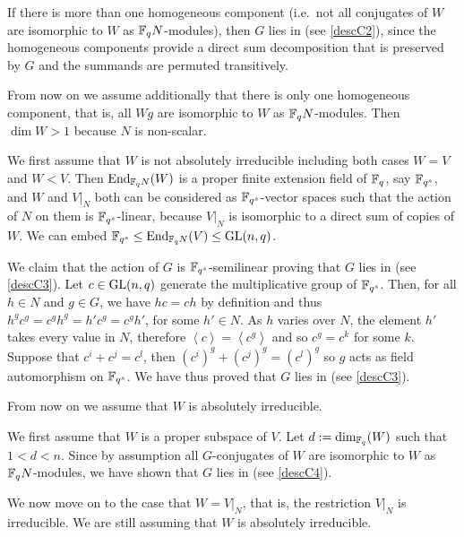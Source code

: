If there is more than one homogeneous component (i.e.~not all conjugates of
$W$ are isomorphic to $W$ as $\mathbb{F}_q N$-modules), then $G$ lies in 
(see \ref{descC2}),
since the homogeneous components provide a direct sum decomposition that is
preserved by $G$ and the summands are permuted transitively.

From now on we assume additionally that there is only one homogeneous
component, that is, all $Wg$ are isomorphic to $W$ as $\mathbb{F}_q N$-modules.
Then $\dim W > 1$ because $N$ is non-scalar.

We first assume that $W$ is not absolutely irreducible including both
cases $W = V$ and $W < V$. Then $\End_{\F_q N}(W)$ is a proper finite
extension field of $\mathbb{F}_q$, say $\mathbb{F}_{q^s}$, and $W$ and $V|_N$
both can be considered as $\mathbb{F}_{q^s}$-vector spaces such that the action of
$N$ on them is $\mathbb{F}_{q^s}$-linear, because $V|_N$ is isomorphic to a direct
sum of copies of $W$. We can embed $\F_{q^s} \le \End_{\F_q N}(V) \le \GL(n,q)$.

We claim that the action of $G$ is $\mathbb{F}_{q^s}$-semilinear proving that $G$ lies
in  (see \ref{descC3}). Let $c \in \GL(n,q)$ generate the
multiplicative group of $\mathbb{F}_{q^s}$. Then, for all $h \in N$ and $g
\in G$, we have $hc=ch$ by definition and thus $h^g c^g = c^g h^g =
h' c^g = c^g h'$, for some $h' \in N$. As $h$ varies over $N$, the
element $h'$ takes every value in $N$, therefore $\left< c \right>
= \left< c^g \right>$ and so $c^g = c^k$ for some $k$. Suppose that
$c^i + c^j = c^l$, then $(c^i)^g + (c^j)^g = (c^l)^g$ so $g$ acts as
field automorphism on $\mathbb{F}_{q^s}$. We have thus proved that $G$ 
lies in  (see \ref{descC3}).

From now on we assume that $W$ is absolutely irreducible.

We first assume that $W$ is a proper subspace of $V$. Let $d :=
\dim_{\mathbb{F}_q}(W)$ such that $1 < d < n$. Since by assumption 
all $G$-conjugates of $W$ are isomorphic to $W$ as $\mathbb{F}_q N$-modules,
we have shown that $G$ lies in  (see \ref{descC4}).

We now move on to the case that $W = V|_N$, that is, the restriction
$V|_N$ is irreducible. We are still assuming that $W$ is
absolutely irreducible.

